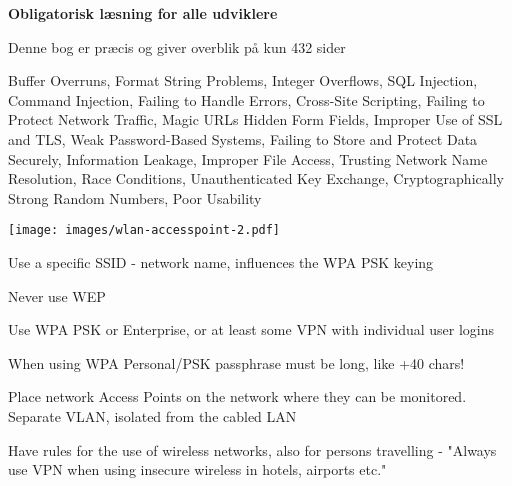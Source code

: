 \documentclass[20pt,landscape,a4paper,footrule]{foils}
\begin{document}
\begin{list1}
\item {\bf Obligatorisk læsning for alle udviklere}
\item Denne bog er præcis og giver overblik på kun 432 sider
\item Buffer Overruns, Format String Problems, Integer Overflows, SQL Injection, Command Injection,
Failing to Handle Errors, Cross-Site Scripting, Failing to Protect Network Traffic, Magic URLs Hidden Form Fields,
Improper Use of SSL and TLS, Weak Password-Based Systems, Failing to Store and Protect Data Securely, Information
Leakage, Improper File Access, Trusting Network Name Resolution, Race Conditions, Unauthenticated Key Exchange, Cryptographically Strong Random Numbers, Poor Usability
\end{list1}



\begin{minipage}{10cm}
\texttt{[image: images/wlan-accesspoint-2.pdf]}
\end{minipage}
\begin{minipage}{\linewidth-10cm}
\begin{list2}
\item Use a specific SSID - network name, influences the WPA PSK keying
\item Never use WEP
\item Use WPA PSK or Enterprise, or at least some VPN with individual user logins

\item When using WPA Personal/PSK passphrase must be long, like +40 chars!
\item Place network Access Points on the network where they can be monitored. Separate VLAN, isolated from the cabled LAN
\item Have rules for the use of wireless networks, also for persons travelling - "Always use VPN when using insecure wireless in hotels, airports etc."
\end{list2}
\end{minipage}


\myquestionspage
\end{document}
